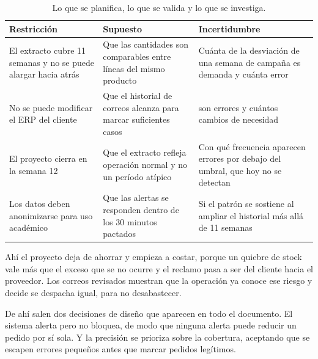\begin{table}[htbp]
\centering
\caption{Lo que se planifica, lo que se valida y lo que se investiga.}
\label{tab:rsi}
\small
\begin{tabularx}{\textwidth}{@{}YYY@{}}
\toprule
\textbf{Restricción} & \textbf{Supuesto} & \textbf{Incertidumbre} \\
\midrule
El extracto cubre 11 semanas y no se puede alargar hacia atrás & Que las cantidades son comparables entre líneas del mismo producto & Cuánta de la desviación de una semana de campaña es demanda y cuánta error \\
No se puede modificar el ERP del cliente & Que el historial de correos alcanza para marcar suficientes casos &  son errores y cuántos cambios de necesidad \\
El proyecto cierra en la semana 12 & Que el extracto refleja operación normal y no un período atípico & Con qué frecuencia aparecen errores por debajo del umbral, que hoy no se detectan \\
Los datos deben anonimizarse para uso académico & Que las alertas se responden dentro de los 30 minutos pactados & Si el patrón se sostiene al ampliar el historial más allá de 11 semanas \\
\bottomrule
\end{tabularx}
\end{table}

 Ahí el proyecto deja de ahorrar y empieza a costar, porque un quiebre de stock vale más que el exceso que se  no ocurre y el reclamo pasa a ser del cliente hacia el proveedor. Los correos revisados muestran que la operación ya conoce ese riesgo y decide  se despacha igual, para no desabastecer.

De ahí salen dos decisiones de diseño que aparecen en todo el documento. El sistema alerta pero no bloquea, de modo que ninguna alerta puede reducir un pedido por sí sola. Y la precisión se prioriza sobre la cobertura, aceptando que se escapen errores pequeños antes que marcar pedidos legítimos.

